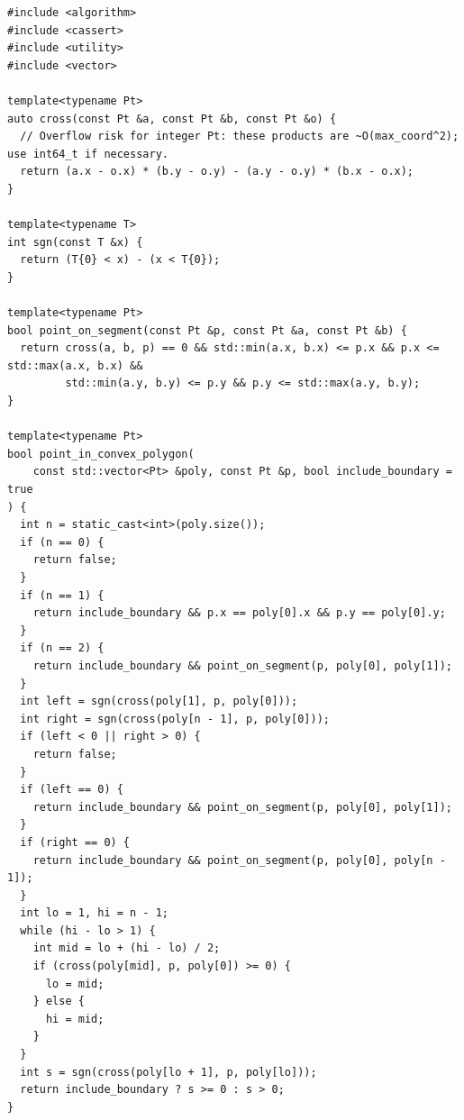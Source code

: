 \begin{lstlisting}[style=cpp]
#include <algorithm>
#include <cassert>
#include <utility>
#include <vector>

template<typename Pt>
auto cross(const Pt &a, const Pt &b, const Pt &o) {
  // Overflow risk for integer Pt: these products are ~O(max_coord^2); use int64_t if necessary.
  return (a.x - o.x) * (b.y - o.y) - (a.y - o.y) * (b.x - o.x);
}

template<typename T>
int sgn(const T &x) {
  return (T{0} < x) - (x < T{0});
}

template<typename Pt>
bool point_on_segment(const Pt &p, const Pt &a, const Pt &b) {
  return cross(a, b, p) == 0 && std::min(a.x, b.x) <= p.x && p.x <= std::max(a.x, b.x) &&
         std::min(a.y, b.y) <= p.y && p.y <= std::max(a.y, b.y);
}

template<typename Pt>
bool point_in_convex_polygon(
    const std::vector<Pt> &poly, const Pt &p, bool include_boundary = true
) {
  int n = static_cast<int>(poly.size());
  if (n == 0) {
    return false;
  }
  if (n == 1) {
    return include_boundary && p.x == poly[0].x && p.y == poly[0].y;
  }
  if (n == 2) {
    return include_boundary && point_on_segment(p, poly[0], poly[1]);
  }
  int left = sgn(cross(poly[1], p, poly[0]));
  int right = sgn(cross(poly[n - 1], p, poly[0]));
  if (left < 0 || right > 0) {
    return false;
  }
  if (left == 0) {
    return include_boundary && point_on_segment(p, poly[0], poly[1]);
  }
  if (right == 0) {
    return include_boundary && point_on_segment(p, poly[0], poly[n - 1]);
  }
  int lo = 1, hi = n - 1;
  while (hi - lo > 1) {
    int mid = lo + (hi - lo) / 2;
    if (cross(poly[mid], p, poly[0]) >= 0) {
      lo = mid;
    } else {
      hi = mid;
    }
  }
  int s = sgn(cross(poly[lo + 1], p, poly[lo]));
  return include_boundary ? s >= 0 : s > 0;
}


\end{lstlisting}
